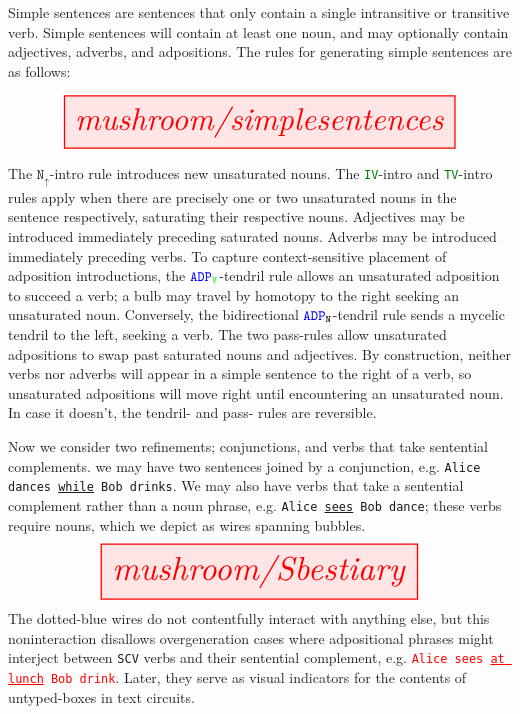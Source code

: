 \begin{myboxB}
\begin{rules}\label{rules:simp}
Simple sentences are sentences that only contain a single intransitive or transitive verb. Simple sentences will contain at least one noun, and may optionally contain adjectives, adverbs, and adpositions. The rules for generating simple sentences are as follows:

\[
\resizebox{0.9\textwidth}{!}{\tikzfig{mushroom/simplesentences}}
\]

The $\texttt{N}_\uparrow$-intro rule introduces new unsaturated nouns. The \textcolor{green}{\texttt{IV}}-intro and \textcolor{green}{\texttt{TV}}-intro rules apply when there are precisely one or two unsaturated nouns in the sentence respectively, saturating their respective nouns. Adjectives may be introduced immediately preceding saturated nouns. Adverbs may be introduced immediately preceding verbs. To capture context-sensitive placement of adposition introductions, the $\textcolor{blue}{\texttt{ADP}}_{\textcolor{green}{\texttt{V}}}$-tendril rule allows an unsaturated adposition to succeed a verb; a bulb may travel by homotopy to the right seeking an unsaturated noun. Conversely, the bidirectional $\textcolor{blue}{\texttt{ADP}}_{\texttt{N}}$-tendril rule sends a mycelic tendril to the left, seeking a verb. The two pass-rules allow unsaturated adpositions to swap past saturated nouns and adjectives. By construction, neither verbs nor adverbs will appear in a simple sentence to the right of a verb, so unsaturated adpositions will move right until encountering an unsaturated noun. In case it doesn't, the tendril- and pass- rules are reversible.
\end{rules}
\end{myboxB}
\clearpage

\begin{myboxB}
\begin{rules}\label{rules:comp}
Now we consider two refinements; conjunctions, and verbs that take sentential complements. we may have two sentences joined by a conjunction, e.g. \texttt{Alice dances \underline{while} Bob drinks}. We may also have verbs that take a sentential complement rather than a noun phrase, e.g. \texttt{Alice \underline{sees} Bob dance}; these verbs require nouns, which we depict as wires spanning bubbles.
\[
\resizebox{0.75\textwidth}{!}{\tikzfig{mushroom/Sbestiary}}
\]
The dotted-blue wires do not contentfully interact with anything else, but this noninteraction disallows overgeneration cases where adpositional phrases might interject between \texttt{SCV} verbs and their sentential complement, e.g. \textcolor{red}{\texttt{Alice sees \underline{at lunch} Bob drink}}. Later, they serve as visual indicators for the contents of untyped-boxes in text circuits.
\end{rules}
\end{myboxB}
\clearpage

